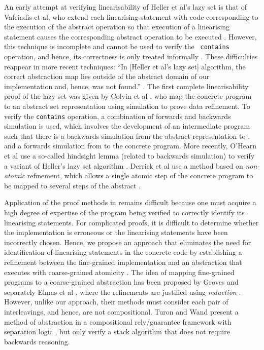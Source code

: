 \documentclass{article}
\theoremstyle{plain}
\newcounter{thm}
\theoremstyle{definition}
\begin{document}
An early attempt at verifying linearisability of Heller et al's lazy
set is that of Vafeiadis et al, who extend each linearising statement
with code corresponding to the execution of the abstract operation so
that execution of a linearising statement causes the corresponding
abstract operation to be executed \cite{VHHS06}. However, this
technique is incomplete and cannot be used to verify the {\tt
  contains} operation, and hence, its correctness is only treated
informally \cite{VHHS06}. These difficulties reappear in more recent
techniques: ``In [Heller et al's lazy set] algorithm, the correct
abstraction map lies outside of the abstract domain of our
implementation and, hence, was not found.''  \cite{Vaf10}.  The first
complete linearisability proof of the lazy set was given by Colvin et
al \cite{CGLM06}, who map the concrete program to an abstract set
representation using simulation to prove data refinement. To verify
the {\tt contains} operation, a combination of forwards and backwards
simulation is used, which
involves the development of an intermediate program  such that
there is a backwards simulation from the abstract representation to
, and a forwards simulation from  to the concrete
program. More recently, O'Hearn et al use a so-called hindsight lemma
(related to backwards simulation) to verify a variant of Heller's lazy
set algorithm \cite{OHea10}.  Derrick et al use a method based on
\emph{non-atomic} refinement, which allows a single atomic step of the
concrete program to be mapped to several steps of the abstract
\cite{DSW11}.

Application of the proof methods in \cite{VHHS06,CGLM06,OHea10,DSW11}
remains difficult because one must acquire a high degree of expertise
of the program being verified to correctly identify its linearising
statements. For complicated proofs, it is difficult to determine
whether the implementation is erroneous or the linearising statements
have been incorrectly chosen. Hence, we propose an approach that
eliminates the need for identification of linearising statements in
the concrete code by establishing a refinement between the
fine-grained implementation and an abstraction that executes with
coarse-grained atomicity \cite{DD12}. The idea of mapping fine-grained
programs to a coarse-grained abstraction has been proposed by Groves
\cite{Gro08} and separately Elmas et al \cite{EQSST10}, where the
refinements are justified using \emph{reduction}
\cite{Lip75}. However, unlike our approach, their methods must
consider each pair of interleavings, and hence, are not
compositional. Turon and Wand present a method of abstraction in a
compositional rely/guarantee framework with separation logic
\cite{TW11}, but only verify a stack algorithm that does not require
backwards reasoning.
\end{document}
